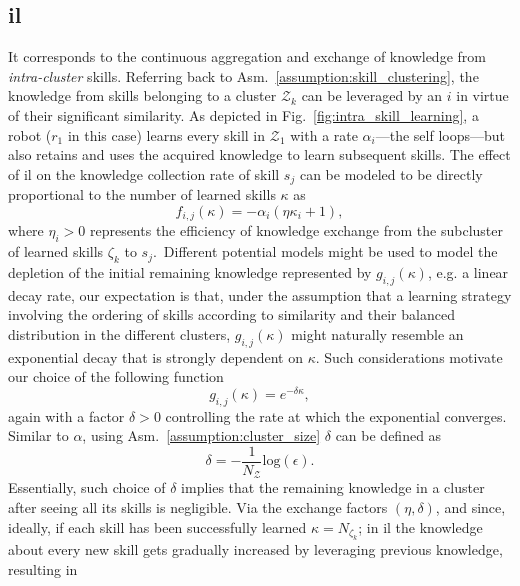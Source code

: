 \subsection{\textbf{\Acl{il}}}
It corresponds to the continuous aggregation and exchange of knowledge from \emph{intra-cluster} skills. Referring back to Asm.~\ref{assumption:skill_clustering}, the knowledge from skills belonging to a cluster ${\mathcal{Z}_k}$ can be leveraged by an  $i$ in virtue of their significant similarity. As depicted in Fig.~\ref{fig:intra_skill_learning}, a robot ($r_1$ in this case) learns every skill in $\mathcal{Z}_1$ with a rate $\alpha_i$---the self loops---but also retains and uses the acquired knowledge to learn subsequent skills. The effect of \ac{il} on the knowledge collection rate of skill $s_j$ can be modeled to be directly proportional to the number of learned skills $\kappa$ as
\begin{equation}\label{eq:f_function_incremental}
	f_{i,j}\left(\kappa\right) = -\alpha_i \left(\eta \kappa_i + 1 \right), 
\end{equation}
where $\eta_i>0$ represents the efficiency of knowledge exchange from the subcluster of learned skills $\zeta_k$ to $s_{j}$.~Different potential models might be used to model the depletion of the initial remaining knowledge represented by $g_{i,j}\left(\kappa\right)$, e.g. a linear decay rate, our expectation is that, under the assumption that a learning strategy involving the ordering of skills according to similarity and their balanced distribution in the different clusters, $g_{i,j}\left(\kappa\right)$ might naturally resemble an exponential decay that is strongly dependent on $\kappa$. Such considerations motivate our choice of the following function
\begin{equation}\label{eq:g_function_incremental}
	g_{i,j}\left(\kappa\right) = e^{-\delta \kappa},
\end{equation}
again with a factor $\delta>0$ controlling the rate at which the exponential converges. Similar to $\alpha$, using Asm.~\ref{assumption:cluster_size} $\delta$ can be defined as 
\begin{equation}\label{eq:delta}
	\delta = -\frac{1}{N_\mathcal{Z}}\text{log}(\epsilon).
\end{equation}
Essentially, such choice of $\delta$ implies that the remaining knowledge in a cluster after seeing all its skills is negligible. Via the exchange factors $(\eta,\delta)$, and since, ideally, if each skill has been successfully learned $\kappa =N_{\zeta_k}$; in \ac{il} the knowledge about every new skill gets gradually increased by leveraging previous knowledge, resulting in
